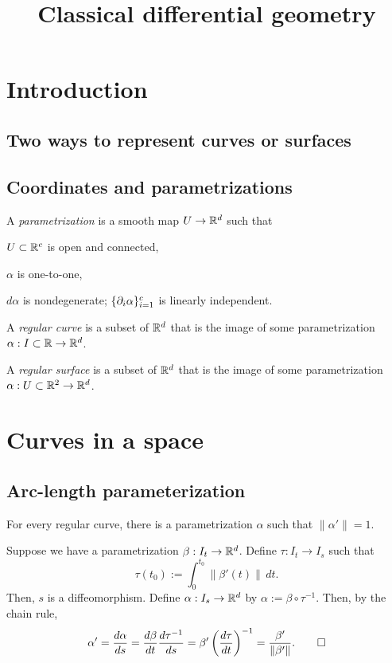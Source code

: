 \documentclass{../exp}
\title{Classical differential geometry}
\def\a{\alpha}
\begin{document}
\maketitle

\section{Introduction}
\subsection{Two ways to represent curves or surfaces}

\subsection{Coordinates and parametrizations}
\begin{defn}
A \emph{parametrization} is a smooth map $U\to\R^d$ such that
\begin{cond}
\item $U\subset\mathbb{R}^c$ is open and connected,
\item $\a$ is one-to-one,
\item $d\a$ is nondegenerate; $\{\pd_i\a\}_{i=1}^c$ is linearly independent.
\end{cond}
\end{defn}

\begin{defn}
A \emph{regular curve} is a subset of $\mathbb{R}^d$ that is the image of some parametrization $\a:I\subset\R\to\R^d$.
\end{defn}
\begin{defn}
A \emph{regular surface} is a subset of $\mathbb{R}^d$ that is the image of some parametrization $\a:U\subset\R^2\to\R^d$.
\end{defn}





\section{Curves in a space}
\subsection{Arc-length parameterization}
\begin{thm}
For every regular curve, there is a parametrization $\a$ such that $\|\a'\|=1$.
\end{thm}
\begin{pf}
Suppose we have a parametrization $\beta:I_t\to\R^d$.
Define $\tau:I_t\to I_s$ such that
\[\tau(t_0):=\int_0^{t_0}\|\beta'(t)\|\,dt.\]
Then, $s$ is a diffeomorphism.
Define $\a:I_s\to\R^d$ by $\a:=\beta\circ\tau^{-1}$.
Then, by the chain rule,
\[\a'=\dd{\a}{s}=\dd{\beta}{t}\dd{\tau^{-1}}{s}=\beta'\left(\dd{\tau}{t}\right)^{-1}=\frac{\beta'}{\|\beta'\|}.\qedhere\]
\end{pf}
\end{document}
